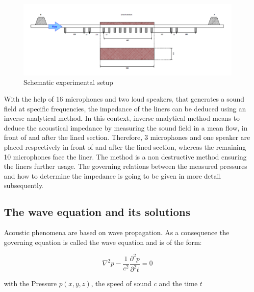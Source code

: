 \documentclass[11pt]{report} %
\begin{document}
\begin{figure}[H]
\centering
\includegraphics[scale=0.8]{./Figures/experimental_setup}
\caption{Schematic experimental setup}
\end{figure}

With the help of 16 microphones and two loud speakers, that generates a sound field at specific frequencies, the impedance of the liners can be deduced using an inverse analytical method.
In this context, inverse analytical method means to deduce the acoustical impedance by measuring the sound field in a mean flow, in front of and after the lined section.
Therefore, 3 microphones and one speaker are placed respectively in front of and after the lined section, whereas the remaining 10 microphones face the liner.
The method is a non destructive method ensuring the liners further usage.
The governing relations between the measured pressures and how to determine the impedance is going to be given in more detail subsequently.


\subsection{The wave equation and its solutions}
Acoustic phenomena are based on wave propagation. As a consequence the governing equation is called the wave equation and is of the form: 

\begin{equation}
    \nabla^2p-\frac{1}{c^2}\frac{\partial^2p}{\partial^2t}  = 0 \label{eqn: waveeqn}
 \end{equation} 
 
 with the Pressure $p(x,y,z)$, the speed of sound $c$ and the time $t$
\end{document}
